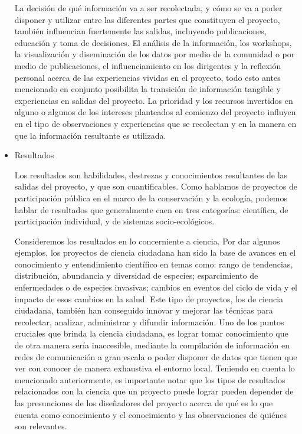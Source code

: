 \begin{itemize}
		La decisión de qué información va a ser recolectada, y cómo se va a poder disponer y utilizar entre las diferentes partes que constituyen el proyecto, también influencian fuertemente las salidas, incluyendo publicaciones, educación y toma de decisiones. El análisis de la información, los workshops, la visualización y diseminación de los datos por medio de la comunidad o por medio de publicaciones, el influenciamiento en los dirigentes y la reflexión personal acerca de las experiencias vividas en el proyecto, todo esto antes mencionado en conjunto posibilita la transición de información tangible y experiencias en salidas del proyecto. La prioridad y los recursos invertidos en alguno o algunos de los intereses planteados al comienzo del proyecto influyen en el tipo de observaciones y experiencias que se recolectan  y en la manera en que la información resultante es utilizada.
		
		\item {Resultados}
		
		Los resultados son habilidades, destrezas y conocimientos resultantes de las salidas del proyecto, y que son cuantificables. Como hablamos de proyectos de participación pública en el marco de la conservación y la ecología, podemos hablar de resultados que generalmente caen en tres categorías: científica, de participación individual, y de sistemas socio-ecológicos. 
		
		Consideremos los resultados en lo concerniente a ciencia. Por dar algunos ejemplos, los proyectos de ciencia ciudadana han sido la base de avances en el conocimiento y entendimiento científico en temas como: rango de tendencias, distribución, abundancia y diversidad de especies; esparcimiento de enfermedades o de especies invasivas; cambios en eventos del ciclo de vida y el impacto de esos cambios en la salud. Este tipo de proyectos, los de ciencia ciudadana, también han conseguido innovar y mejorar las técnicas para recolectar, analizar, administrar y difundir información. Uno de los puntos cruciales que brinda la ciencia ciudadana, es lograr tomar conocimiento que de otra manera sería inaccesible, mediante la compilación de información en redes de comunicación a gran escala o poder disponer de datos que tienen que ver con conocer de manera exhaustiva el entorno local. Teniendo en cuenta lo mencionado anteriormente, es importante notar que los tipos de resultados relacionados con la ciencia que un proyecto puede lograr pueden depender de las presunciones de los diseñadores del proyecto acerca de qué es lo que cuenta como conocimiento y el conocimiento y las observaciones de quiénes son relevantes.
		

\end{itemize}
